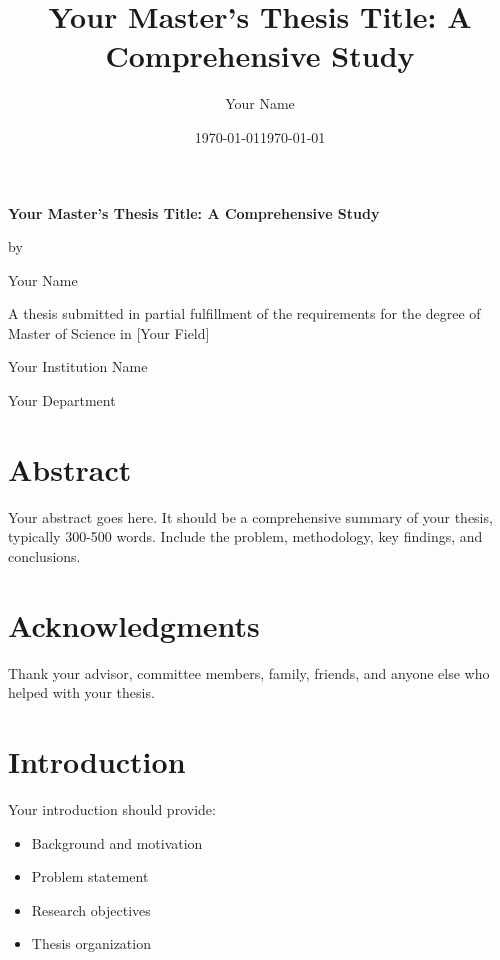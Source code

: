 \documentclass[12pt]{report}
\title{Your Master's Thesis Title: A Comprehensive Study}
\author{Your Name}
\date{\today}
\begin{document}
\begin{titlepage}
\centering
\vspace*{2cm}

{\LARGE \textbf{Your Master's Thesis Title: A Comprehensive Study}}

\vspace{1.5cm}

{\large by}

\vspace{0.5cm}

{\large Your Name}

\vspace{1.5cm}

A thesis submitted in partial fulfillment of the requirements for the degree of Master of Science in [Your Field]

\vspace{1cm}

Your Institution Name

Your Department

\vspace{1cm}

\date{\today}
\end{titlepage}

\chapter*{Abstract}
Your abstract goes here. It should be a comprehensive summary of your thesis, typically 300-500 words. Include the problem, methodology, key findings, and conclusions.

\chapter*{Acknowledgments}
Thank your advisor, committee members, family, friends, and anyone else who helped with your thesis.

\tableofcontents
\listoffigures
\listoftables

\chapter{Introduction}
Your introduction should provide:
\begin{itemize}
    \item Background and motivation
    \item Problem statement
    \item Research objectives
    \item Thesis organization
\end{itemize}
\end{document}
